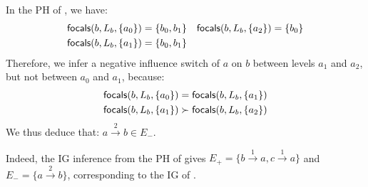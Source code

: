 \begin{example*}
In the PH of , we have:
\begin{align*}
\mathsf{focals}(b, L_b, \{a_0\}) &= \{b_0, b_1\} & \mathsf{focals}(b, L_b, \{a_2\}) &= \{b_0\} \\
\mathsf{focals}(b, L_b, \{a_1\}) &= \{b_0, b_1\}
\end{align*}
Therefore, we infer a negative influence switch of $a$ on $b$ between levels $a_1$ and $a_2$, but not between $a_0$ and $a_1$, because:
\begin{align*}
\mathsf{focals}(b, L_b, \{a_0\}) &= \mathsf{focals}(b, L_b, \{a_1\}) \\
\mathsf{focals}(b, L_b, \{a_1\}) &\succ \mathsf{focals}(b, L_b, \{a_2\})
\end{align*}
We thus deduce that: $a \xrightarrow{2} b \in E_-$.

Indeed, the IG inference from the PH of  gives
$E_+ = \{b \xrightarrow{1} a, c \xrightarrow{1} a\}$ and
$E_- = \{a \xrightarrow{2} b\}$, corresponding to the IG of .
\end{example*}
